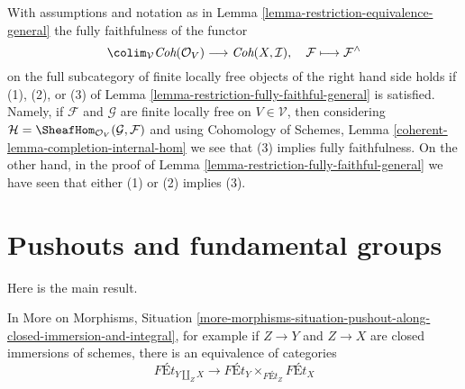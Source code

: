 \begin{remark}
\label{remark-fully-faithful-easy}
With assumptions and notation as in
Lemma \ref{lemma-restriction-equivalence-general}
the fully faithfulness of the functor
$$
\colim_\mathcal{V} \textit{Coh}(\mathcal{O}_V)
\longrightarrow
\textit{Coh}(X, \mathcal{I}),
\quad
\mathcal{F} \longmapsto \mathcal{F}^\wedge
$$
on the full subcategory of finite locally free objects of the right hand side
holds if (1), (2), or (3) of
Lemma \ref{lemma-restriction-fully-faithful-general}
is satisfied. Namely, if $\mathcal{F}$ and $\mathcal{G}$
are finite locally free on $V \in \mathcal{V}$, then considering
$\mathcal{H} = \SheafHom_{\mathcal{O}_V}(\mathcal{G}, \mathcal{F})$
and using Cohomology of Schemes, Lemma
\ref{coherent-lemma-completion-internal-hom}
we see that (3) implies fully faithfulness.
On the other hand, in the proof of
Lemma \ref{lemma-restriction-fully-faithful-general}
we have seen that either (1) or (2) implies (3).
\end{remark}





\section{Pushouts and fundamental groups}
\label{section-pushouts}

\noindent
Here is the main result.

\begin{lemma}
\label{lemma-pushout-along-closed-immersion-and-integral}
In More on Morphisms, Situation
\ref{more-morphisms-situation-pushout-along-closed-immersion-and-integral},
for example if $Z \to Y$ and $Z \to X$ are closed immersions of schemes,
there is an equivalence of categories
$$
\textit{F\'Et}_{Y \amalg_Z X}
\longrightarrow
\textit{F\'Et}_Y
\times_{\textit{F\'Et}_Z}
\textit{F\'Et}_X
$$
\end{lemma}

